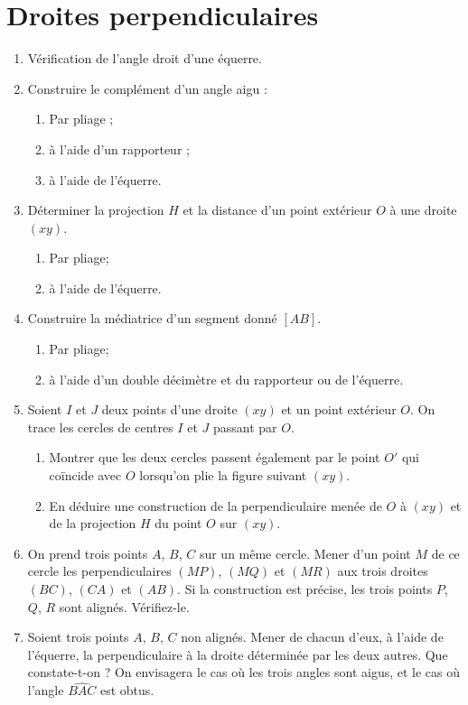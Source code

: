 
\chapter{Droites perpendiculaires} 
\begin{enumerate}
\item Vérification de l'angle droit d'une équerre.
\item Construire le complément d'un angle aigu : \begin{enumerate}
\item Par pliage ; 
\item à l'aide d'un rapporteur ; 
\item à l'aide de l'équerre.
\end{enumerate}
\item Déterminer la projection $H$ et la distance d'un point extérieur $O$ à une droite $(xy)$. \begin{enumerate}
\item Par pliage; \item à l'aide de l'équerre.
\end{enumerate}
\item Construire la médiatrice d'un segment donné $[AB]$. \begin{enumerate}
\item Par pliage; \item à l'aide d'un double décimètre et du rapporteur ou de l'équerre.
\end{enumerate}
\item Soient $I$ et $J$ deux points d'une droite $(xy)$ et un point extérieur $O$.
On trace les cercles de centres $I$ et $J$ passant par $O$. \begin{enumerate}
\item Montrer que les deux cercles passent également par le point $O'$ qui coïncide avec $O$ lorsqu'on plie la figure suivant $(xy)$.
\item En déduire une construction de la perpendiculaire menée de $O$ à $ (xy)$ et de la projection $H$ du point $O$ sur $(xy)$. 
\end{enumerate}
\item On prend trois points $A$, $B$, $C$ sur un même cercle. Mener d'un point $M$ de
ce cercle les perpendiculaires $(MP)$, $(MQ)$ et $(MR)$ aux trois droites $(BC)$, 
$(CA)$ et $(AB)$. Si la construction est précise, les trois points $P$, $Q$, $R$ sont alignés. Vérifiez-le. 
\item Soient trois points $A$, $B$, $C$ non alignés. Mener de chacun d'eux, à l'aide
de l'équerre, la perpendiculaire à la droite déterminée par les deux autres. Que constate-t-on ? On envisagera le cas où les trois angles sont aigus, et le cas où l'angle $\widehat{BAC}$ est obtus.

\end{enumerate}
